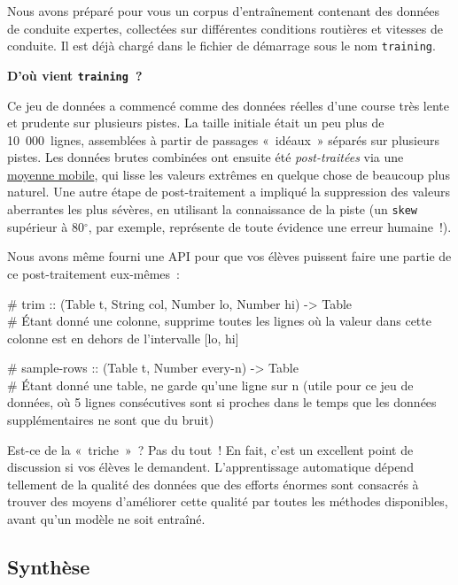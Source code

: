 \documentclass[12pt,a4paper]{article}
\newcommand{\contrat}[1]{%
  \begin{contractbox}
    \ttfamily #1
  \end{contractbox}
}
\begin{document}
\begin{instructornotes}
  Nous avons préparé pour vous un corpus d'entraînement contenant des données de conduite expertes, collectées sur différentes conditions routières et vitesses de conduite. Il est déjà chargé dans le fichier de démarrage sous le nom \texttt{training}.

  \vspace{0.3em}
  \textbf{D'où vient \texttt{training}~?}

  Ce jeu de données a commencé comme des données réelles d'une course très lente et prudente sur plusieurs pistes. La taille initiale était un peu plus de 10~000~lignes, assemblées à partir de passages «~idéaux~» séparés sur plusieurs pistes. Les données brutes combinées ont ensuite été \emph{post-traitées} via une \href{https://fr.wikipedia.org/wiki/Moyenne_mobile}{moyenne mobile}, qui lisse les valeurs extrêmes en quelque chose de beaucoup plus naturel. Une autre étape de post-traitement a impliqué la suppression des valeurs aberrantes les plus sévères, en utilisant la connaissance de la piste (un \texttt{skew} supérieur à 80$^\circ$, par exemple, représente de toute évidence une erreur humaine~!).

  Nous avons même fourni une API pour que vos élèves puissent faire une partie de ce post-traitement eux-mêmes~:

  \contrat{\# trim :: (Table t, String col, Number lo, Number hi) -> Table\\
\# Étant donné une colonne, supprime toutes les lignes où la valeur dans cette colonne est en dehors de l'intervalle [lo, hi]}

  \contrat{\# sample-rows :: (Table t, Number every-n) -> Table\\
\# Étant donné une table, ne garde qu'une ligne sur n (utile pour ce jeu de données, où 5 lignes consécutives sont si proches dans le temps que les données supplémentaires ne sont que du bruit)}

  Est-ce de la «~triche~»~? Pas du tout~! En fait, c'est un excellent point de discussion si vos élèves le demandent. L'apprentissage automatique dépend tellement de la qualité des données que des efforts énormes sont consacrés à trouver des moyens d'améliorer cette qualité par toutes les méthodes disponibles, avant qu'un modèle ne soit entraîné.
\end{instructornotes}

\subsection{Synthèse}
\end{document}
